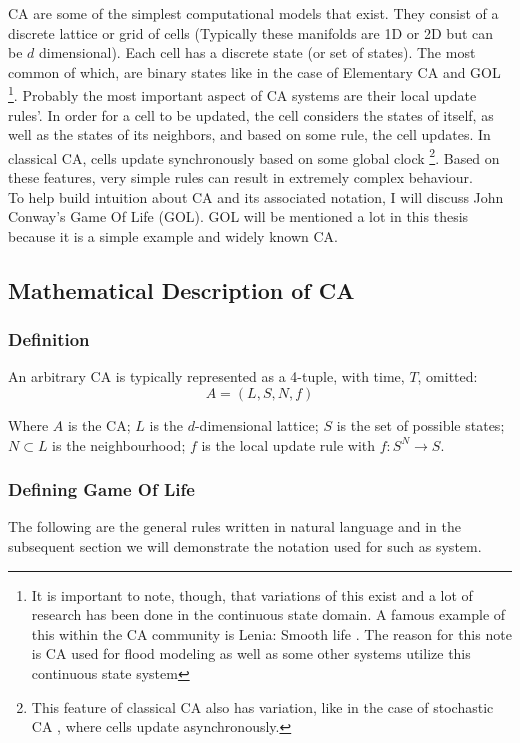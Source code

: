 CA are some of the simplest computational models that exist. They consist of a discrete lattice or grid of cells (Typically these manifolds are 1D or 2D but can be $d$ dimensional). Each cell has a discrete state (or set of states). The most common of which, are binary states like in the case of Elementary CA and GOL \footnote{It is important to note, though, that variations of this exist and a lot of research has been done in the continuous state domain. A famous example of this within the CA community is Lenia: Smooth life \cite{chan2018lenia}. The reason for this note is CA used for flood modeling as well as some other systems utilize this continuous state system}. Probably the most important aspect of CA systems are their local update rules'. In order for a cell to be updated, the cell considers the states of itself, as well as the states of its neighbors, and based on some rule, the cell updates. In classical CA, cells update synchronously based on some global clock \footnote{This feature of classical CA also has variation, like in the case of stochastic CA \cite{fates2013stochastic}, where cells update asynchronously.}. Based on these features, very simple rules can result in extremely complex behaviour. \\
To help build intuition about CA and its associated notation, I will discuss John Conway's Game Of Life (GOL). GOL will be mentioned a lot in this thesis because it is a simple example and widely known CA.

\subsection{Mathematical Description of CA}
\subsubsection*{Definition}

An arbitrary CA is typically represented as a 4-tuple, with time, $T$, omitted:
\begin{equation} \label{eq:2.1}
	A = (L, S, N, f)
\end{equation}

Where $A$ is the CA; $L$ is the $d$-dimensional lattice; $S$ is the set of possible states; $N \subset L$ is the neighbourhood; $f$ is the local update rule with $f: S^{N}\rightarrow S$. 
\subsubsection*{Defining Game Of Life}
The following are the general rules written in natural language and in the subsequent section we will demonstrate the notation used for such as system.

